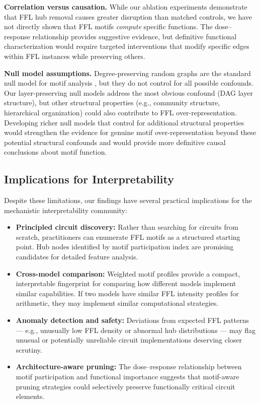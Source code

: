 \textbf{Correlation versus causation.} While our ablation experiments demonstrate that FFL hub removal causes greater disruption than matched controls, we have not directly shown that FFL motifs \emph{compute} specific functions. The dose--response relationship provides suggestive evidence, but definitive functional characterization would require targeted interventions that modify specific edges within FFL instances while preserving others.

\textbf{Null model assumptions.} Degree-preserving random graphs are the standard null model for motif analysis \cite{milo2002network}, but they do not control for all possible confounds. Our layer-preserving null models address the most obvious confound (DAG layer structure), but other structural properties (e.g., community structure, hierarchical organization) could also contribute to FFL over-representation. Developing richer null models that control for additional structural properties would strengthen the evidence for genuine motif over-representation beyond these potential structural confounds and would provide more definitive causal conclusions about motif function.

\subsection{Implications for Interpretability}
Despite these limitations, our findings have several practical implications for the mechanistic interpretability community:

\begin{itemize}
\item \textbf{Principled circuit discovery:} Rather than searching for circuits from scratch, practitioners can enumerate FFL motifs as a structured starting point. Hub nodes identified by motif participation index are promising candidates for detailed feature analysis.
\item \textbf{Cross-model comparison:} Weighted motif profiles provide a compact, interpretable fingerprint for comparing how different models implement similar capabilities. If two models have similar FFL intensity profiles for arithmetic, they may implement similar computational strategies.
\item \textbf{Anomaly detection and safety:} Deviations from expected FFL patterns --- e.g., unusually low FFL density or abnormal hub distributions --- may flag unusual or potentially unreliable circuit implementations deserving closer scrutiny.
\item \textbf{Architecture-aware pruning:} The dose--response relationship between motif participation and functional importance suggests that motif-aware pruning strategies could selectively preserve functionally critical circuit elements.
\end{itemize}

